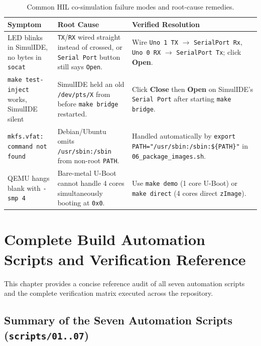 \documentclass[11pt,a4paper,oneside]{report}
\begin{document}
\begin{table}[!htbp]
\centering
\caption{Common HIL co-simulation failure modes and root-cause remedies.}
\label{tab:ch7_troubleshoot}
\begin{tabularx}{\linewidth}{l X X}
\toprule
\textbf{Symptom} & \textbf{Root Cause} & \textbf{Verified Resolution} \\
\midrule
LED blinks in SimulIDE, no bytes in \texttt{socat} & \texttt{TX}/\texttt{RX} wired straight instead of crossed, or \texttt{Serial Port} button still says \texttt{Open}. & Wire \texttt{Uno 1 TX} $\rightarrow$ \texttt{SerialPort Rx}, \texttt{Uno 0 RX} $\rightarrow$ \texttt{SerialPort Tx}; click \textbf{Open}. \\
\texttt{make test-inject} works, SimulIDE silent & SimulIDE held an old \texttt{/dev/pts/X} from before \texttt{make bridge} restarted. & Click \textbf{Close} then \textbf{Open} on SimulIDE's \texttt{Serial Port} after starting \texttt{make bridge}. \\
\texttt{mkfs.vfat: command not found} & Debian/Ubuntu omits \texttt{/usr/sbin:/sbin} from non-root \texttt{PATH}. & Handled automatically by \texttt{export PATH="/usr/sbin:/sbin:\$\{PATH\}"} in \texttt{06\_package\_images.sh}. \\
QEMU hangs blank with \texttt{-smp 4} & Bare-metal U-Boot cannot handle 4 cores simultaneously booting at \texttt{0x0}. & Use \texttt{make demo} (1 core U-Boot) or \texttt{make direct} (4 cores direct \texttt{zImage}). \\
\bottomrule
\end{tabularx}
\end{table}


\chapter{Complete Build Automation Scripts and Verification Reference}

This chapter provides a concise reference audit of all seven automation scripts and the complete verification matrix executed across the repository.

\section{Summary of the Seven Automation Scripts (\texttt{scripts/01..07})}
\end{document}
